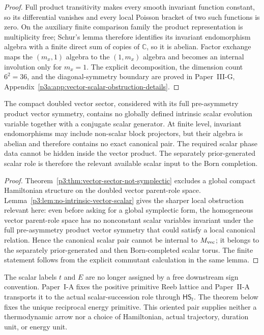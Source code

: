 \documentclass[12pt,a4paper]{article}
\begin{document}
\begin{proof}
Full product transitivity makes every smooth invariant function constant, so
its differential vanishes and every local Poisson bracket of two such
functions is zero.  On the auxiliary finite comparison family the product representation is
multiplicity free; Schur's lemma therefore identifies its invariant
endomorphism algebra with a finite direct sum of copies of \(\mathbb C\), so
it is abelian.  Factor exchange maps the \((m_x,1)\) algebra to the
\((1,m_x)\) algebra and becomes an internal involution only for \(m_x=1\).
The explicit decomposition, the dimension count \(6^2=36\), and the
diagonal-symmetry boundary are proved in
Paper~III-G, Appendix~\ref{p3a:app:vector-scalar-obstruction-details}.
\end{proof}

\begin{corollary}
\label{p3:cor:no-intrinsic-scalar-pair}
The compact doubled vector sector, considered with its full pre-asymmetry
product vector symmetry, contains no globally defined intrinsic scalar evolution variable together
with a conjugate scalar generator.  At finite level, invariant endomorphisms
may include non-scalar block projectors, but their algebra is abelian and
therefore contains no exact canonical pair.  The required scalar phase data cannot be hidden inside the vector product.  The separately prior-generated scalar role is therefore the relevant available scalar input to the Born completion.
\end{corollary}

\begin{proof}
Theorem~\ref{p3:thm:vector-sector-not-symplectic} excludes a global compact Hamiltonian structure on
the doubled vector parent-role space.  Lemma~\ref{p3:lem:no-intrinsic-vector-scalar} gives the sharper local
obstruction relevant here: even before asking for a global symplectic form, the homogeneous vector parent-role space has no nonconstant scalar variables invariant under the full pre-asymmetry product vector
symmetry that could satisfy a local canonical relation.  Hence the canonical
scalar pair cannot be internal to \(M_{\rm vec}\); it belongs to the separately prior-generated and then Born-completed scalar torus.  The finite statement follows from
the explicit commutant calculation in the same lemma.
\end{proof}


\begin{remark}
\label{p3:rem:provisional-scalar-labels}
The scalar labels \(t\) and \(E\) are no longer assigned by a free downstream
sign convention.  Paper~I-A fixes the positive primitive Reeb lattice and
Paper~II-A transports it to the actual scalar-succession role through
\(\mathsf{HS}_t\).  The theorem below fixes the unique reciprocal energy
primitive.  This oriented pair supplies neither a thermodynamic arrow nor a
choice of Hamiltonian, actual trajectory, duration unit, or energy unit.
\end{remark}
\end{document}
